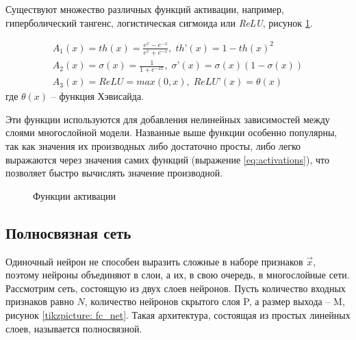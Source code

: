 \indent
\indent
Существуют множество различных функций активации, например, гиперболический
тангенс, логистическая сигмоида или \textit{ReLU}, рисунок \ref{tikzpicture: activations}.

\begin{equation}\label{eq:activations}
	\begin{gathered}
	    A_{1}(x) = th(x) = \frac{e^x - e^{-x}}{e^x + e^{-x}},    \;   th’(x) = {1 - th(x)^2}  \\    
	    A_{2}(x) = \sigma(x) = \frac{1}{1 + e^{-2x}},   \;   \sigma’(x) = \sigma(x)(1 - \sigma(x)) \\
	    A_{3}(x) = ReLU = max(0, x),   \;   ReLU’(x) = \theta(x)
	\end{gathered}
\end{equation}
где $\theta(x)$ -- функция Хэвисайда.

\indent
\indent
Эти функции используются
для добавления нелинейных зависимостей между слоями многослойной модели.
Названные выше функции особенно популярны, 
так как значения их производных либо достаточно просты, либо легко 
выражаются через значения самих функций (выражение \ref{eq:activations}), 
что позволяет быстро вычислять значение производной.

\begin{figure}[h!]
	\begin{center}
	\end{center}
\caption{Функции активации}
\label{tikzpicture: activations}
\end{figure}

\subsection{Полносвязная сеть}

\indent
\indent
Одиночный нейрон не способен выразить сложные в наборе
признаков $\vec{x}$, поэтому нейроны объединяют в слои, а их, в свою 
очередь, в многослойные сети. Рассмотрим сеть,
состоящую из двух слоев нейронов. Пусть количество входных признаков
равно $N$, количество нейронов скрытого слоя P,
а размер выхода -- M, рисунок \ref{tikzpicture: fc_net}. Такая архитектура, 
состоящая из простых линейных слоев, называется полносвязной.

